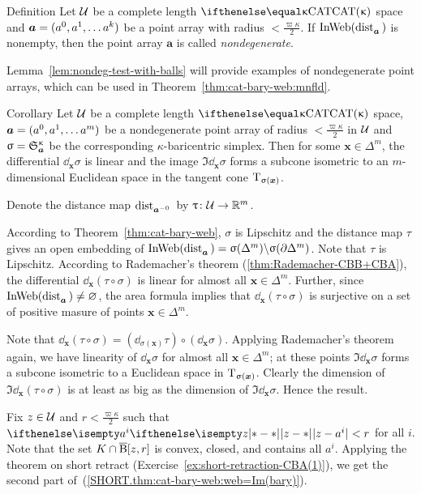 \begin{thm}{Definition}
Let $\mathcal{U}$ be a complete length $\CAT\kappa$ space
and $\bm{a}\z=(a^0,a^1,\dots a^\kay)$ be a point array with radius $<\tfrac{\varpi\kappa}{2}$.
If $\mathop{\rm InWeb}\nolimits(\mathop{\rm dist}\nolimits_{\bm{a}}^{{}}{}{})$ is nonempty, then the point array $\bm{a}$ is called \emph{nondegenerate}.
\end{thm}

Lemma~\ref{lem:nondeg-test-with-balls} will provide examples of nondegenerate point arrays,
which can be used in Theorem~\ref{thm:cat-bary-web:mnfld}.

\begin{thm}{Corollary}\label{cor:LinDim>bary}
Let $\mathcal{U}$ be a complete length $\CAT\kappa$ space,
$\bm{a}\z=(a^0,a^1,\dots a^m)$ be a nondegenerate point array 
of radius $<\tfrac{\varpi\kappa}{2}$ in $\mathcal{U}$
and $\upsigma=\mathfrak{S}_{\bm{a}}^{\upkappa}$ be the corresponding $\kappa$-baricentric simplex.
Then for some $\bm{x}\in \Delta^m$,
the differential $\dd_{\bm{x}}\sigma$ is linear 
and the image $\Im\dd_{\bm{x}}\sigma$
forms a subcone isometric to an $m$-dimensional Euclidean space in the tangent cone $\text{\rm T}_{\upsigma(\bm{x})}$.
\end{thm}


Denote the distance map  $\mathop{\rm dist}\nolimits_{\bm{a}^{{-} 0}}^{{}}{}{}$ by $\tau\:\spc{U}\to\RR^m$.

According to Theorem~\ref{thm:cat-bary-web},
$\sigma$ is Lipschitz
and  the distance map $\tau$  
gives an open embedding of  
$\mathop{\rm InWeb}\nolimits(\mathop{\rm dist}\nolimits_{\bm{a}}^{{}}{}{})=\upsigma(\Delta^m)\backslash\upsigma(\partial\Delta^m)$.
Note that $\tau$ is Lipschitz.
According to Rademacher's theorem (\ref{thm:Rademacher-CBB+CBA}), 
the differential 
$\dd_{\bm{x}}(\tau\circ\sigma)$
is linear for almost all $\bm{x}\in\Delta^m$.
Further, since $\InWeb(\distfun{\bm{a}}{}{})\z\ne\emptyset$,
the area formula %
implies that $\dd_{\bm{x}}(\tau\circ\sigma)$ is surjective on a set of positive masure of points $\bm{x}\in\Delta^m$.

Note that $\dd_{\bm{x}}(\tau\circ\sigma)=(\dd_{\sigma(\bm{x})}\tau)\circ(\dd_{\bm{x}}\sigma)$.
Applying Rademacher's theorem again, we have linearity of 
$\dd_{\bm{x}}\sigma$  for almost all $\bm{x}\in\Delta^m$;
at these points $\Im\dd_{\bm{x}}\sigma$ forms a subcone isometric to a Euclidean space in $\text{\rm T}_{\upsigma(\bm{x})}$.
Clearly the dimension of $\Im\dd_{\bm{x}}(\tau\circ\sigma)$ is at least as big as the dimension of $\Im\dd_{\bm{x}}\sigma$.
Hence the result.
\qeds


Fix $z\in\spc{U}$ and $r<\tfrac{\varpi\kappa}2$
such that $\dist{z}{a^i}{}<r$ for all $i$.
Note that the set $K\cap \cBall[z,r]$ is convex, closed, and contains all $a^i$.
Applying the theorem on short retract (Exercise~\ref{ex:short-retraction-CBA(1)}),
we get the second part of~(\ref{SHORT.thm:cat-bary-web:web=Im(bary)}).

